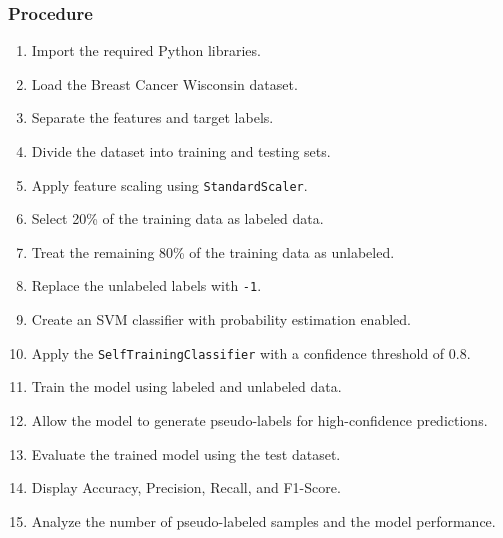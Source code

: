 \documentclass[a4paper,11pt]{article}
\begin{document}
\subsubsection{Procedure}
\begin{enumerate}
    \item Import the required Python libraries.
    \item Load the Breast Cancer Wisconsin dataset.
    \item Separate the features and target labels.
    \item Divide the dataset into training and testing sets.
    \item Apply feature scaling using \texttt{StandardScaler}.
    \item Select 20\% of the training data as labeled data.
    \item Treat the remaining 80\% of the training data as unlabeled.
    \item Replace the unlabeled labels with \texttt{-1}.
    \item Create an SVM classifier with probability estimation enabled.
    \item Apply the \texttt{SelfTrainingClassifier} with a confidence threshold of 0.8.
    \item Train the model using labeled and unlabeled data.
    \item Allow the model to generate pseudo-labels for high-confidence predictions.
    \item Evaluate the trained model using the test dataset.
    \item Display Accuracy, Precision, Recall, and F1-Score.
    \item Analyze the number of pseudo-labeled samples and the model performance.
\end{enumerate}
\end{document}
